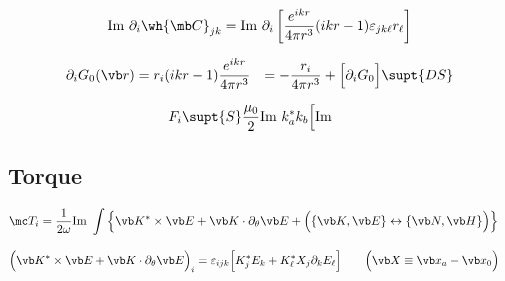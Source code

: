 \begin{align*}
 \text{Im } \partial_i \wh{\mb C}_{jk}
&= \text{Im }
   \partial_i\left[ \frac{e^{ikr}}{4\pi r^3}(ikr-1)\varepsilon_{jk\ell}r_\ell\right]
\\
\end{align*}

\begin{align*}
\partial_i G_0(\vb r)
   &= r_i(ikr-1)\frac{e^{ikr}}{4\pi r^3}
   &= -\frac{r_i}{4\pi r^3} + \Big[\partial_i G_0\Big]\supt{DS}
\end{align*}

\begin{align*}
 F_i\supt{S}
 &\frac{\mu_0}{2} \text{Im }{k_a^* k_b}\Big[\text{Im }
\end{align*}

\subsection{Torque}

\begin{align*}
 \mc T_i 
&= \frac{1}{2\omega}\text{Im }
\int \Big\{\vb K^* \times \vb E + \vb K \cdot \partial_{\theta}\vb E
           +\Big( \{\vb K, \vb E\} \leftrightarrow \{\vb N, \vb H\}\Big)\Big\}
\end{align*}

\begin{align*}
\Big(\vb K^* \times \vb E + \vb K \cdot \partial_{\theta}\vb E\Big)_i 
&=
 \varepsilon_{ijk}\Big[ K^*_j E_k + K^*_\ell X_j \partial_k E_\ell\Big]
\qquad \Big(\vb X \equiv \vb x_a - \vb x_0\Big)
\end{align*}


